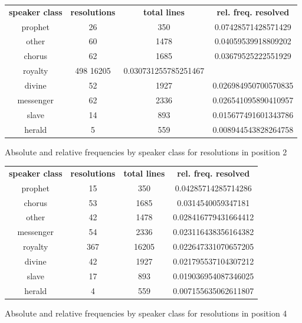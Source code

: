 
\begin{figure}
\caption{Absolute and relative frequencies by speaker class for resolutions in position 2}
\begin{center}
\begin{tabular}{c | c | c | c}
\textbf{speaker class} & \textbf{resolutions} & \textbf{total lines} & \textbf{rel. freq. resolved} \\
prophet & 26 &  350 & 0.07428571428571429 \\
other & 60 &  1478  & 0.04059539918809202 \\
chorus & 62 & 1685  & 0.03679525222551929 \\
royalty & 498 16205 & 0.030731255785251467 \\
divine & 52 & 1927 & 0.026984950700570835 \\
messenger & 62 & 2336 & 0.026541095890410957 \\
slave & 14 & 893 & 0.015677491601343786 \\
herald  & 5 & 559 & 0.008944543828264758
\end{tabular}
\end{center}
\end{figure}

\begin{figure}
\caption{Absolute and relative frequencies by speaker class for resolutions in position 4}
\begin{center}
\begin{tabular}{c | c | c | c}
\textbf{speaker class} & \textbf{resolutions} & \textbf{total lines} & \textbf{rel. freq. resolved} \\
prophet & 15 & 350 & 0.04285714285714286 \\
chorus  & 53 & 1685 & 0.0314540059347181 \\
other & 42 & 1478 & 0.028416779431664412 \\
messenger & 54 & 2336 & 0.023116438356164382 \\
royalty & 367 & 16205 & 0.022647331070657205 \\
divine  & 42 & 1927 & 0.021795537104307212 \\
slave & 17 & 893 & 0.019036954087346025 \\
herald  & 4 & 559 & 0.007155635062611807 \\
\end{tabular}
\end{center}
\end{figure}


